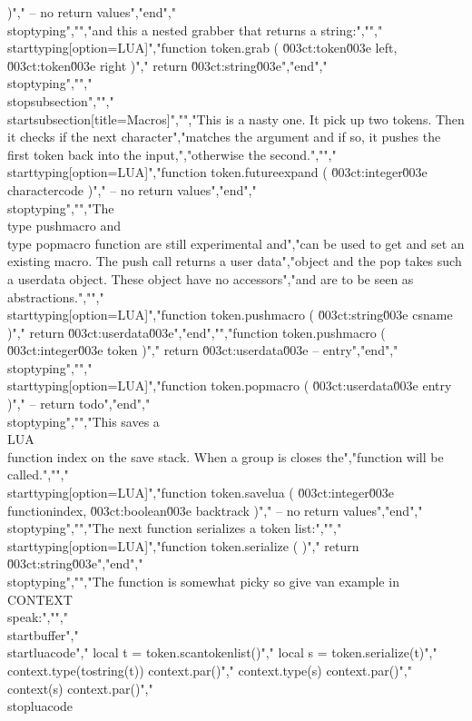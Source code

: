 )","    -- no return values","end","\\stoptyping","","and this a nested grabber that returns a string:","","\\starttyping[option=LUA]","function token.grab ( \u003ct:token\u003e left, \u003ct:token\u003e right )","    return \u003ct:string\u003e","end","\\stoptyping","","\\stopsubsection","","\\startsubsection[title={Macros}]","","This is a nasty one. It pick up two tokens. Then it checks if the next character","matches the argument and if so, it pushes the first token back into the input,","otherwise the second.","","\\starttyping[option=LUA]","function token.futureexpand ( \u003ct:integer\u003e charactercode )","    -- no return values","end","\\stoptyping","","The \\type {pushmacro} and \\type {popmacro} function are still experimental and","can be used to get and set an existing macro. The push call returns a user data","object and the pop takes such a userdata object. These object have no accessors","and are to be seen as abstractions.","","\\starttyping[option=LUA]","function token.pushmacro ( \u003ct:string\u003e csname )","    return \u003ct:userdata\u003e","end","","function token.pushmacro ( \u003ct:integer\u003e token )","    return \u003ct:userdata\u003e -- entry","end","\\stoptyping","","\\starttyping[option=LUA]","function token.popmacro ( \u003ct:userdata\u003e entry )","    -- return todo","end","\\stoptyping","","This saves a \\LUA\\ function index on the save stack. When a group is closes the","function will be called.","","\\starttyping[option=LUA]","function token.savelua ( \u003ct:integer\u003e functionindex, \u003ct:boolean\u003e backtrack )","    -- no return values","end","\\stoptyping","","The next function serializes a token list:","","\\starttyping[option=LUA]","function token.serialize ( )","    return \u003ct:string\u003e","end","\\stoptyping","","The function is somewhat picky so give van example in \\CONTEXT\\ speak:","","\\startbuffer","\\startluacode","    local t = token.scantokenlist()","    local s = token.serialize(t)","    context.type(tostring(t)) context.par()","    context.type(s)           context.par()","    context(s)                context.par()","\\stopluacode 